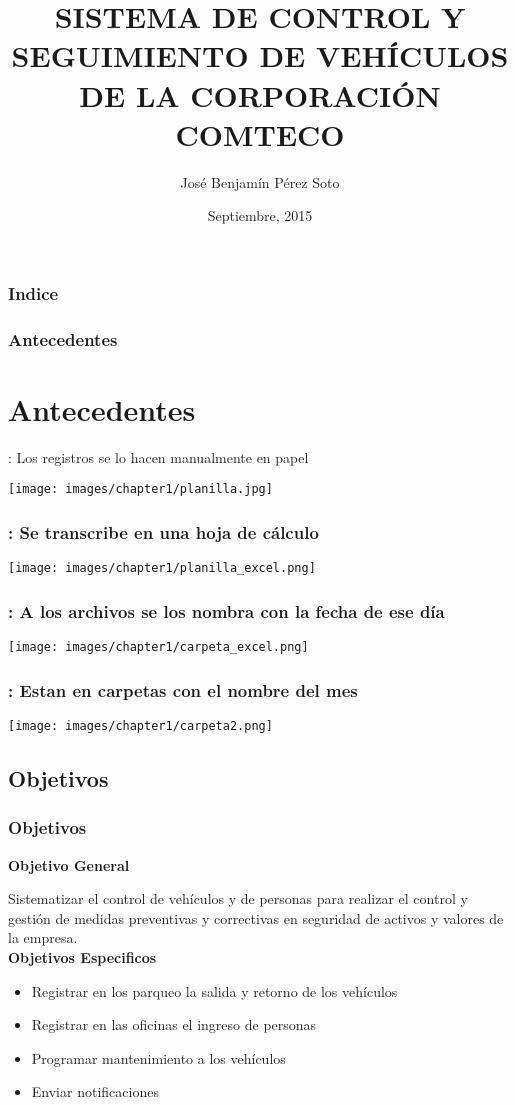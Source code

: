 \documentclass{beamer}
\title{SISTEMA DE CONTROL Y SEGUIMIENTO DE VEH\'ICULOS DE LA CORPORACI\'ON COMTECO}
\author{Jos\'e Benjam\'in P\'erez Soto}
\institute{Universidad Mayor de San Sim\'on \\ Carrera de Licenciatura en Inform\'atica}
\date{Septiembre, 2015}
\begin{document}
\frame{\titlepage}

\begin{frame}
\frametitle{Indice}
\tableofcontents
\end{frame}

\begin{frame}
  \frametitle{Antecedentes}
  \section{Antecedentes}
  : Los registros se lo hacen manualmente en papel
  \begin{center}
    \texttt{[image: images/chapter1/planilla.jpg]}
  \end{center}
\end{frame}

\begin{frame}
  \frametitle{: Se transcribe en una hoja de c\'alculo}
  \begin{center}
    \texttt{[image: images/chapter1/planilla\_excel.png]}
  \end{center}
\end{frame}

\begin{frame}
  \frametitle{: A los archivos se los nombra con la fecha de ese d\'ia}
  \begin{center}
    \texttt{[image: images/chapter1/carpeta\_excel.png]}
  \end{center}
\end{frame}

\begin{frame}
  \frametitle{: Estan en carpetas con el nombre del mes}
  \begin{center}
    \texttt{[image: images/chapter1/carpeta2.png]}
  \end{center}
\end{frame}

\begin{frame}
  \section{Objetivos}
  \frametitle{Objetivos}
  {\bfseries Objetivo General}

  Sistematizar el control de veh\'iculos y de personas para realizar el control
  y gesti\'on de medidas preventivas y correctivas en seguridad de activos y
  valores de la empresa.\\

  {\bfseries Objetivos Especificos}
  \begin{itemize}
      \item Registrar en los parqueo la salida y retorno de los veh\'iculos
      \item Registrar en las oficinas el ingreso de personas
      \item Programar mantenimiento a los veh\'iculos
      \item Enviar notificaciones
  \end{itemize}
\end{frame}
\end{document}
